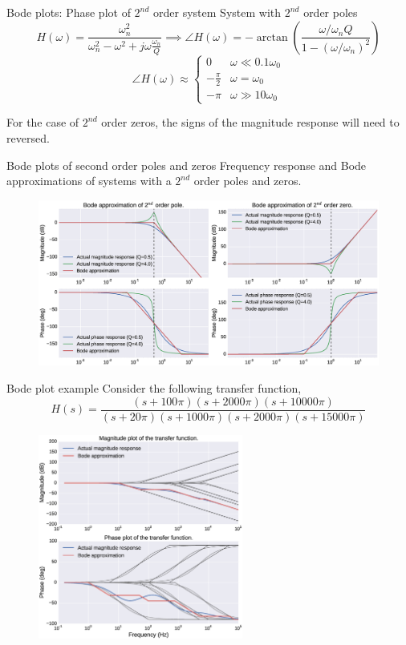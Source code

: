 \documentclass{beamer}
\begin{document}
\begin{frame}{Bode plots: Phase plot of $2^{nd}$ order system}
System with $2^{nd}$ order poles
\[ H(\omega) = \frac{\omega_n^2}{\omega_n^2 - \omega^2 + j\omega\frac{\omega_n}{Q}}  \implies \angle H(\omega)= -\arctan \left(\frac{\omega/\omega_nQ}{1-\left(\omega/\omega_n\right)^2}\right)\]
\[ \angle H(\omega) \approx \begin{cases}
0 & \omega \ll 0.1\omega_0\\
-\frac{\pi}{2} & \omega = \omega_0\\
-\pi & \omega \gg 10\omega_0
\end{cases} \]

For the case of $2^{nd}$ order zeros, the signs of the magnitude response will need to reversed.
\end{frame}

\begin{frame}{Bode plots of second order poles and zeros}
Frequency response and Bode approximations of systems with a $2^{nd}$ order poles and zeros.
\begin{figure}
\centering
\includegraphics[width=1.05\textwidth]{img/2nd_bode.eps}
\end{figure}
\end{frame}

\begin{frame}{Bode plot example}
Consider the following transfer function,
\[ H(s) = \frac{(s+100\pi)(s+2000\pi)(s+10000\pi)}{(s+20\pi)(s+1000\pi)(s+2000\pi)(s+15000\pi)} \]

\begin{figure}
\centering
\includegraphics[width=0.6\textwidth]{img/bode.eps}
\end{figure}
\end{frame}
\end{document}
